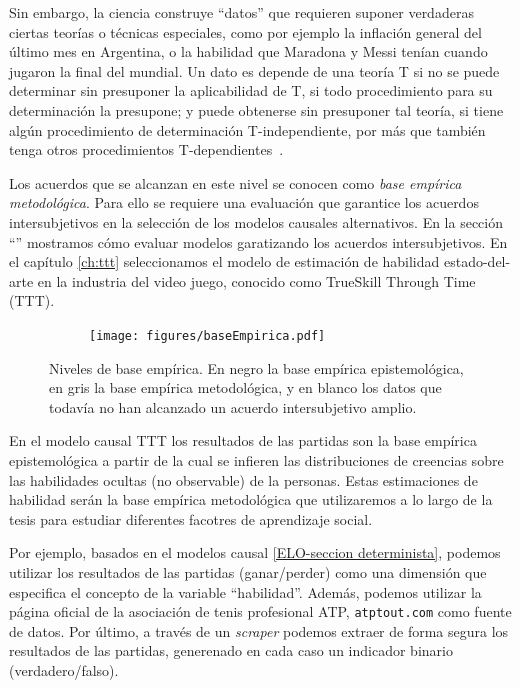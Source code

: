 \documentclass[a4paper,10pt]{book}
\theoremstyle{definition}
\begin{document}
Sin embargo, la ciencia construye ``datos'' que requieren suponer verdaderas ciertas teor\'ias o t\'ecnicas especiales, como por ejemplo la inflaci\'on general del último mes en Argentina, o la habilidad que Maradona y Messi ten\'ian cuando jugaron la final del mundial.
Un dato es depende de una teor\'ia T si no se puede determinar sin presuponer la aplicabilidad de T, si todo procedimiento para su determinaci\'on la presupone; y puede obtenerse sin presuponer tal teor\'ia, si tiene algún procedimiento de determinaci\'on T-independiente, por m\'as que tambi\'en tenga otros procedimientos T-dependientes~\cite{lorenzano2002-concepcionEstructuralista}.

Los acuerdos que se alcanzan en este nivel se conocen como \emph{base emp\'irica metodol\'ogica}.
Para ello se requiere una evaluaci\'on que garantice los acuerdos intersubjetivos en la selecci\'on de los modelos causales alternativos.
En la secci\'on ``'' mostramos c\'omo evaluar modelos garatizando los acuerdos intersubjetivos.
En el cap\'itulo \ref{ch:ttt} seleccionamos el modelo de estimaci\'on de habilidad estado-del-arte en la industria del video juego, conocido como TrueSkill Through Time (TTT).

\begin{figure}[H]
    \centering
    \begin{subfigure}[b]{0.48\textwidth}
    \texttt{[image: figures/baseEmpirica.pdf]}
    \end{subfigure}
    \caption{Niveles de base emp\'irica. En negro la base emp\'irica epistemol\'ogica, en gris la base emp\'irica metodol\'ogica, y en blanco los datos que todav\'ia no han alcanzado un acuerdo intersubjetivo amplio. }
\end{figure}

En el modelo causal TTT los resultados de las partidas son la base emp\'irica epistemol\'ogica a partir de la cual se infieren las distribuciones de creencias sobre las habilidades ocultas (no observable) de la personas.
Estas estimaciones de habilidad ser\'an la base emp\'irica metodol\'ogica que utilizaremos a lo largo de la tesis para estudiar diferentes facotres de aprendizaje social.


Por ejemplo, basados en el modelos causal \ref{ELO-seccion determinista}, podemos utilizar los resultados de las partidas (ganar/perder) como una dimensi\'on que especifica el concepto de la variable ``habilidad''.
Adem\'as, podemos utilizar la p\'agina oficial de la asociaci\'on de tenis profesional ATP, \texttt{atptout.com} como fuente de datos.
Por último, a trav\'es de un \emph{scraper} podemos extraer de forma segura los resultados de las partidas, generenado en cada caso un indicador binario (verdadero/falso).
\end{document}
